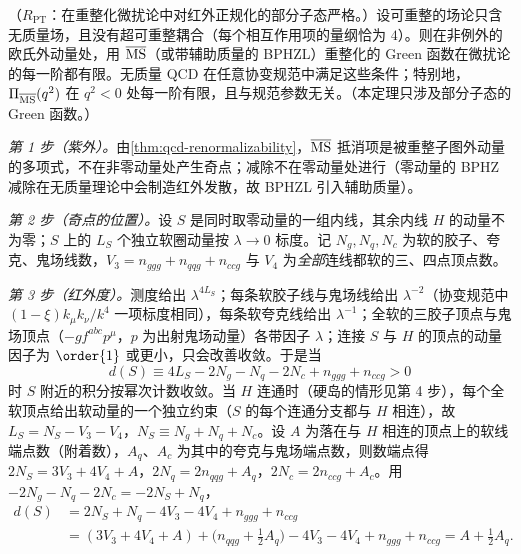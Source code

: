\begin{theorem}\label{thm:ee-euclid-ir}
（$R_{\mathrm{PT}}$：在重整化微扰论中对红外正规化的部分子态严格。）设可重整的场论只含无质量场，且没有超可重整耦合（每个相互作用项的量纲恰为 $4$）。则在非例外的欧氏外动量处，用 $\overline{\rm MS}$（或带辅助质量的 BPHZL）重整化的 Green 函数在微扰论的每一阶都有限。无质量 QCD 在任意协变规范中满足这些条件；特别地，$\Pi_{\overline{\rm MS}}(q^2)$ 在 $q^2<0$ 处每一阶有限，且与规范参数无关。（本定理只涉及部分子态的 Green 函数。）
\end{theorem}
\begin{proofsketch}
\emph{第 1 步（紫外）。}由\cref{thm:qcd-renormalizability}，$\overline{\rm MS}$ 抵消项是被重整子图外动量的多项式，不在非零动量处产生奇点；减除不在零动量处进行（零动量的 BPHZ 减除在无质量理论中会制造红外发散，故 BPHZL 引入辅助质量\cite{LowensteinZimmermann1975}）。

\emph{第 2 步（奇点的位置）。}设 $S$ 是同时取零动量的一组内线，其余内线 $H$ 的动量不为零；$S$ 上的 $L_S$ 个独立软圈动量按 $\lambda\to0$ 标度。记 $N_g,N_q,N_c$ 为软的胶子、夸克、鬼场线数，$V_3=n_{ggg}+n_{qqg}+n_{ccg}$ 与 $V_4$ 为\emph{全部}连线都软的三、四点顶点数。

\emph{第 3 步（红外度）。}测度给出 $\lambda^{4L_S}$；每条软胶子线与鬼场线给出 $\lambda^{-2}$（协变规范中 $(1-\xi)k_\mu k_\nu/k^4$ 一项标度相同），每条软夸克线给出 $\lambda^{-1}$；全软的三胶子顶点与鬼场顶点（$-gf^{abc}p^\mu$，$p$ 为出射鬼场动量）各带因子 $\lambda$；连接 $S$ 与 $H$ 的顶点的动量因子为 $\order{1}$ 或更小，只会改善收敛。于是当
\begin{equation}\label{eq:ee-irdeg}
d(S)\equiv4L_S-2N_g-N_q-2N_c+n_{ggg}+n_{ccg}>0
\end{equation}
时 $S$ 附近的积分按幂次计数收敛。当 $H$ 连通时（硬岛的情形见第 4 步），每个全软顶点给出软动量的一个独立约束（$S$ 的每个连通分支都与 $H$ 相连），故 $L_S=N_S-V_3-V_4$，$N_S\equiv N_g+N_q+N_c$。设 $A$ 为落在与 $H$ 相连的顶点上的软线端点数（附着数），$A_q$、$A_c$ 为其中的夸克与鬼场端点数，则数端点得 $2N_S=3V_3+4V_4+A$，$2N_q=2n_{qqg}+A_q$，$2N_c=2n_{ccg}+A_c$。用 $-2N_g-N_q-2N_c=-2N_S+N_q$，
\begin{equation}\label{eq:ee-irdeg2}
\begin{split}
d(S)&=2N_S+N_q-4V_3-4V_4+n_{ggg}+n_{ccg}\\
&=(3V_3+4V_4+A)+\big(n_{qqg}+\tfrac12A_q\big)-4V_3-4V_4+n_{ggg}+n_{ccg}=A+\tfrac12A_q .
\end{split}
\end{equation}


\end{proofsketch}
